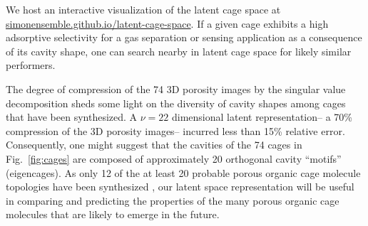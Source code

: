 \documentclass[journal=jacsat,manuscript=article,layout=traditional]{achemso}
\begin{document}
We host an interactive visualization of the latent cage space at \url{simonensemble.github.io/latent-cage-space}. If a given cage exhibits a high adsorptive selectivity for a gas separation or sensing application as a consequence of its cavity shape, one can search nearby in latent cage space for likely similar performers.

The degree of compression of the 74 3D porosity images by the singular value decomposition sheds some light on the diversity of cavity shapes among cages that have been synthesized. A $\nu=22$ dimensional latent representation-- a 70\% compression of the 3D porosity images-- incurred less than 15\% relative error. Consequently, one might suggest that the cavities of the 74 cages in Fig.~\ref{fig:cages} are composed of approximately 20 orthogonal cavity ``motifs'' (eigencages). As only 12 of the at least 20 probable porous organic cage molecule topologies have been synthesized \cite{santolini2017topological}, our latent space representation will be useful in comparing and predicting the properties of the many porous organic cage molecules that are likely to emerge in the future.
\end{document}
